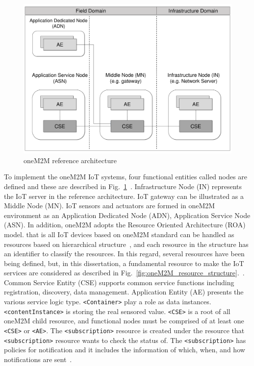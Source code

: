 \begin{figure}[H]
	\centering
	\includegraphics[width=\textwidth]{figures/fig_onem2m_architecture.pdf}
    \caption{oneM2M reference architecture}
    \label{fig:onem2m_reference_architecture}
\end{figure}

To implement the oneM2M IoT systems, four functional entities called nodes are defined and these are described in Fig.~\ref{fig:onem2m_reference_architecture}~\cite{swetina2014toward, husain2014interworking}. Infrastructure Node (IN) represents the IoT server in the reference architecture. IoT gateway can be illustrated as a Middle Node (MN). IoT sensors and actuators are formed in oneM2M environment as an Application Dedicated Node (ADN), Application Service Node (ASN). In addition, oneM2M adopts the Resource Oriented Architecture (ROA) model. that is all IoT devices based on oneM2M standard can be handled as resources based on hierarchical structure~\cite{zhao2018onem2m}, and each resource in the structure has an identifier to classify the resources. In this regard, several resources have been being defined, but, in this dissertation, a fundamental resource to make the IoT services are considered as described in Fig.~\ref{fig:oneM2M_resource_structure}.~\cite{hwang2019interworking}. Common Service Entity (CSE) supports common service functions including registration, discovery, data management. Application Entity (AE) presents the various service logic type. \texttt{<Container>} play a role as data instances. \texttt{<contentInstance>} is storing the real sensored value. \texttt{<CSE>} is a root of all oneM2M child resource, and functional nodes must be comprised of at least one \texttt{<CSE>} or \texttt{<AE>}. The \texttt{<subscription>} resource is created under the resource that \texttt{<subscription>} resource wants to check the status of. The \texttt{<subscription>} has policies for notification and it includes the information of which, when, and how notifications are sent~\cite{2020_onem2m_ts_0001}.

